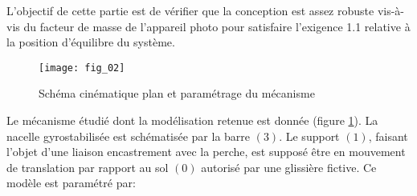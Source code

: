 \begin{obj}
 L'objectif de cette partie est de vérifier que la conception est assez robuste vis-à-vis du facteur de masse de l'appareil photo pour satisfaire l'exigence 1.1 relative à la position d'équilibre du système.
\end{obj}

\ifprof
\else

\begin{figure}[!h]
\centering
\texttt{[image: fig\_02]}
\caption{Schéma cinématique plan et paramétrage du mécanisme}
\label{Cy_11_Ch_03_PFS_2D_TD_05_fig_02}
\end{figure}



Le mécanisme étudié dont la modélisation retenue est donnée (figure \ref{Cy_11_Ch_03_PFS_2D_TD_05_fig_02}). La nacelle gyrostabilisée est schématisée par la barre $(3)$. Le support $(1)$, faisant l'objet d'une liaison encastrement avec la perche, est supposé être en mouvement de translation par rapport au sol $(0)$ autorisé par une glissière fictive. Ce modèle est paramétré par:


